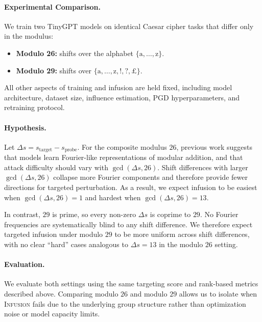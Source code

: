 \documentclass{article}
\theoremstyle{plain}
\theoremstyle{definition}
\theoremstyle{remark}
\begin{document}
\paragraph{Experimental Comparison.}
We train two TinyGPT models on identical Caesar cipher tasks that differ only in the modulus:
\begin{itemize}
    \item \textbf{Modulo 26:} shifts over the alphabet $\{\text{a},\ldots,\text{z}\}$.
    \item \textbf{Modulo 29:} shifts over $\{\text{a},\ldots,\text{z},\text{!},\text{?},\text{£}\}$.
\end{itemize}
All other aspects of training and infusion are held fixed, including model architecture, dataset size, influence estimation, PGD hyperparameters, and retraining protocol.

\paragraph{Hypothesis.}
Let $\Delta s = s_{\text{target}} - s_{\text{probe}}$.
For the composite modulus $26$, previous work suggests that models learn Fourier-like representations of modular addition, and that attack difficulty should vary with $\gcd(\Delta s, 26)$. Shift differences with larger $\gcd(\Delta s, 26)$ collapse more Fourier components and therefore provide fewer directions for targeted perturbation. As a result, we expect infusion to be easiest when $\gcd(\Delta s, 26) = 1$ and hardest when $\gcd(\Delta s, 26) = 13$.

In contrast, $29$ is prime, so every non-zero $\Delta s$ is coprime to $29$. No Fourier frequencies are systematically blind to any shift difference. We therefore expect targeted infusion under modulo $29$ to be more uniform across shift differences, with no clear ``hard'' cases analogous to $\Delta s = 13$ in the modulo $26$ setting.

\paragraph{Evaluation.}
We evaluate both settings using the same targeting score and rank-based metrics described above. Comparing modulo $26$ and modulo $29$ allows us to isolate when \textsc{Infusion} fails due to the underlying group structure rather than optimization noise or model capacity limits.



\end{document}
